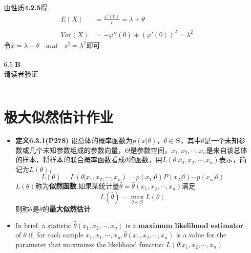 \documentclass[a4paper]{ctexart}    %
\begin{document}
	由性质\textbf{4.2.5}得
	\begin{equation*}
		\begin{split}
			E(X) &= \frac{\varphi'(0)}{i} = \lambda + \theta \\
			&\\
			Var(X) &= -\varphi''(0) + (\varphi'(0))^2 = \lambda^2
		\end{split}
	\end{equation*}
	令$ \bar{x} = \lambda + \theta \quad and \quad s^2 = \lambda^2 $即可 \\
	\\
	6.5 \quad \textbf{B} \\
	请读者验证 \\ \\
	\section{极大似然估计作业}
	\begin{tcolorbox}
		[
		colframe=blue!25,
		colback=blue!10,
		coltitle=blue!20!black,  
		fonttitle=\bfseries,
		adjusted title=Formula Or Theorem:
		]
		\begin{itemize}
			\item \textbf{定义6.3.1(P278)} 设总体的概率函数为$ p(x|\theta) $，$ \theta \in \Theta $，其中$ \theta $是一个未知参数或几个未知参数组成的参数向量，$ \Theta $是参数空间，$ x_1, x_2, \cdots, x_n $是来自该总体的样本，将样本的联合概率函数看成$ \theta $的函数，用$ L(\theta|x_1, x_2, \cdots, x_n) $表示，简记为$ L(\theta) $，
			\begin{equation*}
				L(\theta) = L(\theta|x_1, x_2, \cdots, x_n) = p(x_1|\theta)P(x_2|\theta)\cdots p(x_n|\theta)
			\end{equation*}
			$ L(\theta) $称为\textbf{似然函数}.如果某统计量$ \hat{\theta} = \hat{\theta}(x_1, x_2, \cdots, x_n) $满足
			\begin{equation*}
				L(\hat{\theta}) = \max\limits_{\theta \in \Theta} L(\theta)
			\end{equation*}
			则称$ \hat{\theta} $是$ \theta $的\textbf{最大似然估计}
			\item In brief, a statistic $ \hat{\theta}(x_1, x_2, \cdots, x_n) $ is a \textbf{maximum likelihood estimator} of $ \theta $ if, for each sample $ x_1, x_1, \cdots, x_n, \hat{\theta}(x_1, x_2, \cdots, x_n) $ is a value for the parameter that maximizes the likelihood function $ L(\theta|x_1, x_2, \cdots, x_n) $
		\end{itemize}
	\end{tcolorbox}
\end{document}
